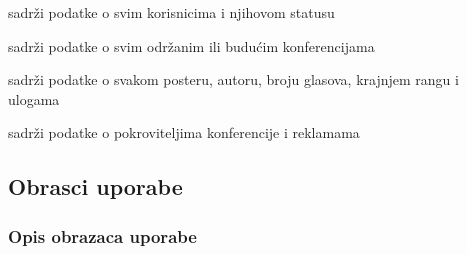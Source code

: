 \begin{packed_enum}
			
				\item  {}
				
				\begin{packed_enum}
					
					\item sadrži podatke o svim korisnicima i njihovom statusu
					\item sadrži podatke o svim održanim ili budućim konferencijama
					\item sadrži podatke o svakom posteru, autoru, broju glasova, krajnjem rangu i ulogama
					\item sadrži podatke o pokroviteljima konferencije i reklamama
					
				\end{packed_enum}
			\end{packed_enum}
			
			\eject 
			
			
				
			\subsection{Obrasci uporabe}
				
				\subsubsection{Opis obrazaca uporabe}
					
